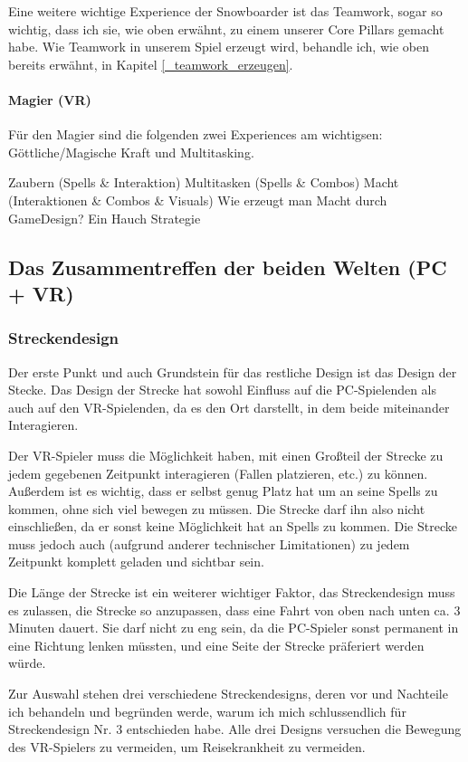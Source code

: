 Eine weitere wichtige Experience der Snowboarder ist das Teamwork, sogar so wichtig, dass ich sie, wie oben erwähnt, zu einem unserer Core Pillars gemacht habe. Wie Teamwork in unserem Spiel erzeugt wird, behandle ich, wie oben bereits erwähnt, in Kapitel \ref{_teamwork_erzeugen}.

\paragraph{Magier (VR)}
Für den Magier sind die folgenden zwei Experiences am wichtigsen: Göttliche/Magische Kraft und Multitasking. 

Zaubern (Spells \& Interaktion)
Multitasken (Spells \& Combos)
Macht (Interaktionen \& Combos \& Visuals) Wie erzeugt man Macht durch GameDesign?
Ein Hauch Strategie


\subsection{Das Zusammentreffen der beiden Welten (PC + VR)}

\subsubsection{Streckendesign}

Der erste Punkt und auch Grundstein für das restliche Design ist das Design der Stecke. Das Design der Strecke hat sowohl Einfluss auf die PC-Spielenden als auch auf den VR-Spielenden, da es den Ort darstellt, in dem beide miteinander Interagieren.

Der VR-Spieler muss die Möglichkeit haben, mit einen Großteil der Strecke zu jedem gegebenen Zeitpunkt interagieren (Fallen platzieren, etc.) zu können. Außerdem ist es wichtig, dass er selbst genug Platz hat um an seine Spells zu kommen, ohne sich viel bewegen zu müssen. Die Strecke darf ihn also nicht einschließen, da er sonst keine Möglichkeit hat an Spells zu kommen. Die Strecke muss jedoch auch (aufgrund anderer technischer Limitationen) zu jedem Zeitpunkt komplett geladen und sichtbar sein.

Die Länge der Strecke ist ein weiterer wichtiger Faktor, das Streckendesign muss es zulassen, die Strecke so anzupassen, dass eine Fahrt von oben nach unten ca. 3 Minuten dauert. Sie darf nicht zu eng sein, da die PC-Spieler sonst permanent in eine Richtung lenken müssten, und eine Seite der Strecke präferiert werden würde.

Zur Auswahl stehen drei verschiedene Streckendesigns, deren vor und Nachteile ich behandeln und begründen werde, warum ich mich schlussendlich für Streckendesign Nr. 3 entschieden habe. Alle drei Designs versuchen die Bewegung des VR-Spielers zu vermeiden, um Reisekrankheit zu vermeiden.

